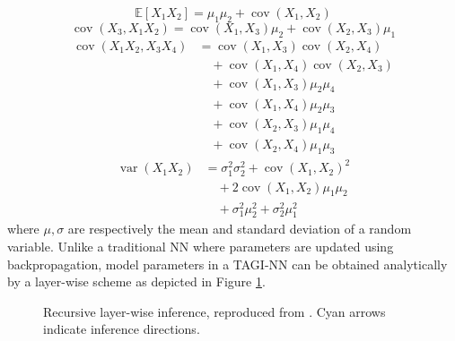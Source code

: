 \documentclass{article}
\begin{document}
\begin{equation*}
    \mathbb{E}\left[X_{1} X_{2}\right] = \mu_{1} \mu_{2} + \operatorname{cov}\left(X_{1}, X_{2}\right)
\end{equation*}
\begin{equation*}
    \operatorname{cov}\left(X_{3}, X_{1} X_{2}\right) = \operatorname{cov}\left(X_{1}, X_{3}\right) \mu_{2} + \operatorname{cov}\left(X_{2}, X_{3}\right) \mu_{1}
\end{equation*}
\begin{align*}
    \operatorname{cov}\left(X_{1} X_{2}, X_{3} X_{4}\right) &= \operatorname{cov}\left(X_{1}, X_{3}\right) \operatorname{cov}\left(X_{2}, X_{4}\right) \nonumber \\
    &\quad + \operatorname{cov}\left(X_{1}, X_{4}\right) \operatorname{cov}\left(X_{2}, X_{3}\right) \nonumber \\
    &\quad + \operatorname{cov}\left(X_{1}, X_{3}\right) \mu_{2} \mu_{4} \nonumber \\
    &\quad + \operatorname{cov}\left(X_{1}, X_{4}\right) \mu_{2} \mu_{3} \nonumber \\
    &\quad + \operatorname{cov}\left(X_{2}, X_{3}\right) \mu_{1} \mu_{4} \nonumber \\
    &\quad + \operatorname{cov}\left(X_{2}, X_{4}\right) \mu_{1} \mu_{3}
\end{align*}
\begin{align*}
    \operatorname{var}\left(X_{1} X_{2}\right) &= \sigma_{1}^{2} \sigma_{2}^{2} + \operatorname{cov}\left(X_{1}, X_{2}\right)^{2} \nonumber \\
    &\quad + 2 \operatorname{cov}\left(X_{1}, X_{2}\right) \mu_{1} \mu_{2} \nonumber \\
    &\quad + \sigma_{1}^{2} \mu_{2}^{2} + \sigma_{2}^{2} \mu_{1}^{2}
\end{align*}
where $\mu, \sigma$ are respectively the mean and standard deviation of a random variable. 
Unlike a traditional NN where parameters are updated using backpropagation, model parameters in a TAGI-NN can be obtained analytically by a layer-wise scheme as depicted in Figure \ref{fig:updateTAGI}.
\begin{figure}[htbp]
\centering
\resizebox{0.9\linewidth}{!}{}
\caption{Recursive layer-wise inference, reproduced from \cite{goulet2020tractable}.  Cyan arrows indicate inference directions.}
\label{fig:updateTAGI}
\end{figure}
\end{document}
